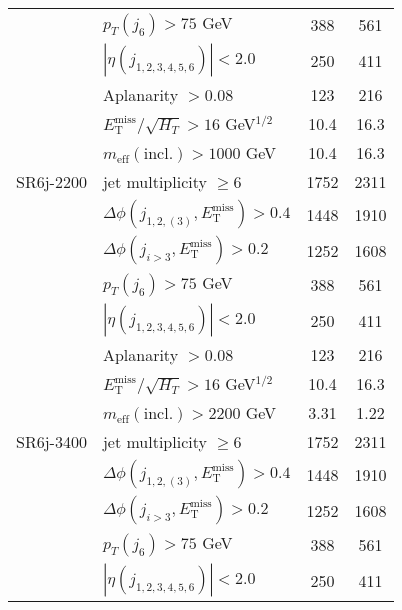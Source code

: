 \documentclass[10pt,fleqn]{article}
\newcommand{\met}{E^\mathrm{miss}_\mathrm{T}}
\newcommand{\meff}{m_\mathrm{eff}}
\begin{document}
\begin{table}[H]
\begin{tabular}{c|l|c|c}
             & $p_T(j_6) > 75$ GeV                             &     388    &   561          \\           
             & $|\eta(j_{1,2,3,4,5,6})|< 2.0$                  &     250    &   411          \\           
             & Aplanarity $> 0.08$                             &     123    &   216          \\                      
             & $\met/\sqrt{H_T} > 16$ GeV$^{1/2}$              &     10.4   &   16.3         \\    
             & $\meff(\mathrm{incl.}) > 1000$ GeV              &     10.4   &   16.3         \\ \midrule        
SR6j-2200    & jet multiplicity $\geq 6$                       &     1752   &   2311          \\
             & $\Delta\phi(j_{1,2,(3)},\met) > 0.4$            &     1448   &   1910          \\
             & $\Delta\phi(j_{i>3},\met) > 0.2$                &     1252   &   1608         \\      
             & $p_T(j_6) > 75$ GeV                             &     388    &   561          \\       
             & $|\eta(j_{1,2,3,4,5,6})|< 2.0$                  &     250    &   411          \\                        
             & Aplanarity $> 0.08$                             &     123    &   216          \\         
             & $\met/\sqrt{H_T} > 16$ GeV$^{1/2}$              &     10.4   &   16.3         \\    
             & $\meff(\mathrm{incl.}) > 2200$ GeV              &     3.31   &   1.22          \\ \midrule    
SR6j-3400    & jet multiplicity $\geq 6$                       &     1752   &   2311         \\
             & $\Delta\phi(j_{1,2,(3)},\met) > 0.4$            &     1448   &   1910         \\
             & $\Delta\phi(j_{i>3},\met) > 0.2$                &     1252   &   1608          \\      
             & $p_T(j_6) > 75$ GeV                             &     388    &   561          \\      
             & $|\eta(j_{1,2,3,4,5,6})|< 2.0$                  &     250    &   411          \\                      

\end{tabular}
\end{table}
\end{document}
